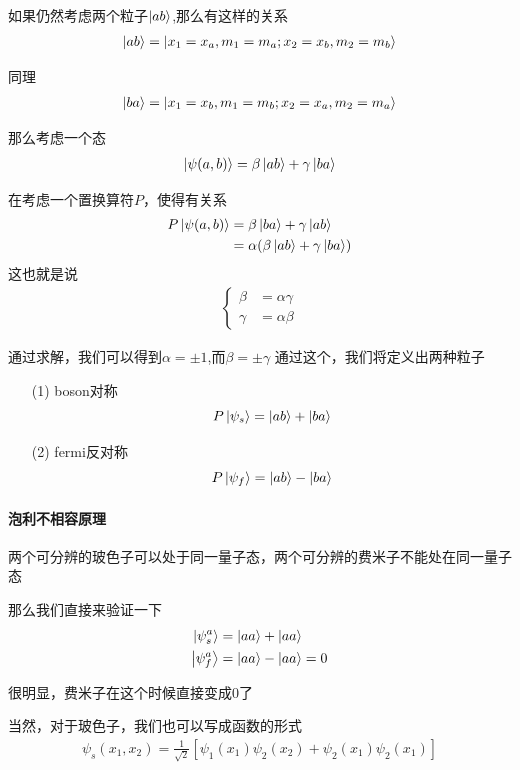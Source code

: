 \documentclass{article}
\begin{document}
如果仍然考虑两个粒子$\ket{ab}$,那么有这样的关系
\begin{align*}
    \ket{ab}=\ket{x_1=x_a,m_1=m_a;x_2=x_b,m_2=m_b}
\end{align*}

同理
\begin{align*}
    \ket{ba}=\ket{x_1=x_b,m_1=m_b;x_2=x_a,m_2=m_a}
\end{align*}

那么考虑一个态
\begin{align*}
    \ket{\psi(a,b)}=\beta\ket{ab}+\gamma\ket{ba}
\end{align*}

在考虑一个置换算符$P$，使得有关系
\begin{align*}
    P\ket{\psi(a,b)}&=\beta\ket{ba}+\gamma\ket{ab}\\
    &=\alpha(\beta\ket{ab}+\gamma\ket{ba})
\end{align*}
这也就是说
\begin{align*}
    \begin{cases}
        \beta&=\alpha\gamma\\
        \gamma&=\alpha\beta
    \end{cases}
\end{align*}

通过求解，我们可以得到$\alpha=\pm 1$,而$\beta =\pm \gamma$
通过这个，我们将定义出两种粒子

\begin{enumerate}
    \item[(1)] boson对称\[P\ket{\psi_s}=\ket{ab}+\ket{ba}\]
    \item[(2)] fermi反对称\[P\ket{\psi_f}=\ket{ab}-\ket{ba}\]
\end{enumerate}

\paragraph{泡利不相容原理}
两个可分辨的玻色子可以处于同一量子态，两个可分辨的费米子不能处在同一量子态

那么我们直接来验证一下
\begin{align*}
    \ket{\psi_s^a}&=\ket{aa}+\ket{aa}\\
    \ket{\psi_f^a}&=\ket{aa}-\ket{aa}=0
\end{align*}

很明显，费米子在这个时候直接变成$0$了

当然，对于玻色子，我们也可以写成函数的形式
\begin{align*}
    \psi_{s}(x_1,x_2)=\frac{1}{\sqrt{2}}\left[\psi_1(x_1)\psi_2(x_2)+\psi_2(x_1)\psi_2(x_1)\right]
\end{align*}
\end{document}
